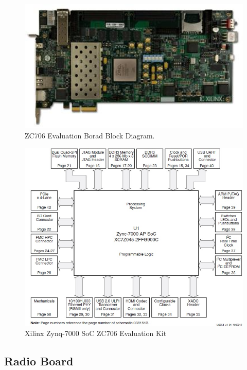 \begin{figure}
\centering
\includegraphics[width=12cm]{content/fig/ZC706.JPG}
\caption{ZC706 Evaluation Borad Block Diagram.}
\end{figure}

\begin{figure}
\centering
\includegraphics[width=12cm]{content/fig/zc706_block_diagram.JPG}
\caption{Xilinx Zynq-7000 SoC ZC706 Evaluation Kit}
\label{fig:zc706}
\end{figure}

\subsection{Radio Board}

